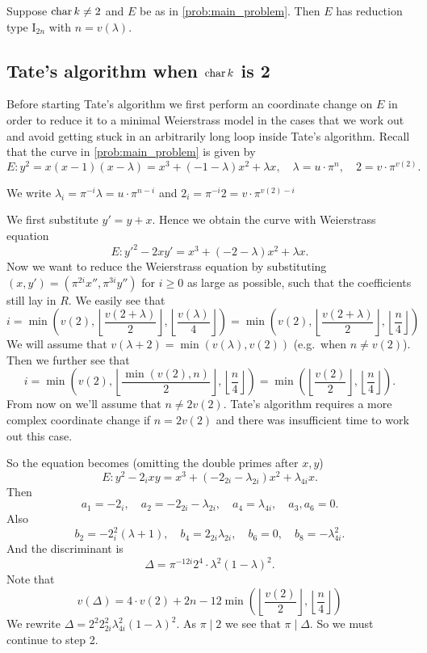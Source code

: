 \begin{proposition}\label{prop:conclusion_tate_tame}
	Suppose $\operatorname{char} k \ne 2$ and $E$ be as in \cref{prob:main_problem}. 
	Then $E$ has reduction type $\mathrm I_{2n}$ with $n = v(\lambda)$. 
\end{proposition}

\subsection{Tate's algorithm when $\operatorname{char} k$ is 2}  \label{sec:char_k_is_2}

Before starting Tate's algorithm we first perform an coordinate change on $E$ in order to reduce it to a minimal Weierstrass model in the cases that we work out and avoid getting stuck in an arbitrarily long loop inside Tate's algorithm. 
Recall that the curve in \cref{prob:main_problem} is given by \[
	E: y^2 = x(x-1)(x-\lambda) = x^3 + (-1 -\lambda) x^2 + \lambda x, \quad \lambda = u \cdot \pi^{n}, \quad 2 = v\cdot \pi^{v(2)}
.\] 
\begin{notation}
	We write $\lambda_i = \pi^{-i} \lambda = u\cdot \pi ^{n -i}$ and $2_i = \pi^{-i}2 = v \cdot \pi^{v(2) - i}$
\end{notation}
We first substitute $y' = y + x$. 
Hence we obtain the curve with Weierstrass equation \[
	E: y'^2 - 2xy' = x^3 + (-2-\lambda) x^2 + \lambda x
.\] 
Now we want to reduce the Weierstrass equation by substituting $(x, y') = (\pi^{2i} x'', \pi^{3i}y'')$ for $i \ge 0$ as large as possible, such that the coefficients still lay in $R$. 
We easily see that \[
	i =  \min\left(v(2), \left\lfloor \frac{v(2 + \lambda)}{2} \right\rfloor,  \left\lfloor \frac{v(\lambda)}{4} \right\rfloor\right) = \min\left(v(2), \left\lfloor \frac{v(2 + \lambda)}{2} \right\rfloor,  \left\lfloor \frac{n}{4} \right\rfloor\right) 
\]
We will assume that $v(\lambda + 2) = \min(v(\lambda), v(2))$ (e.g.\ when $n \ne v(2)$). 
Then we further see that \[
	i = \min\left(v(2), \left\lfloor \frac{\min (v(2), n)}{2} \right\rfloor,  \left\lfloor \frac{n}{4} \right\rfloor\right)  = \min\left(\left\lfloor \frac{v(2)}{2}\right\rfloor, \left\lfloor \frac{n}{4} \right\rfloor \right)
.\] 
From now on we'll assume that $n \ne 2v(2)$. 
Tate's algorithm requires a more complex coordinate change if $n = 2 v(2)$ and there was insufficient time to work out this case. 

So the equation becomes (omitting the double primes after $x, y$) \[
	E: y^2 - 2_i xy = x^3 + (-2_{2i} - \lambda_{2i})x^2 + \lambda_{4i}x
.\] 
Then \[
a_1 = -2_i, \quad a_2 = -2_{2i} - \lambda_{2i}, \quad a_4 =  \lambda_{4i}, \quad a_3, a_6 = 0 
.\] 
Also 
\[
	b_2 = -2_{i}^2 (\lambda + 1), \quad b_4 = 2_{2i}\lambda_{2i}, \quad b_6 = 0,\quad  b_8 = -\lambda_{4i}^2
.\] 
And the discriminant is \[
	\Delta = \pi^{-12i} 2^{4}\cdot \lambda^2(1 - \lambda)^2
.\] 
Note that \[
	v(\Delta) = 4\cdot v(2)+ 2n - 12 \min\left(\left\lfloor \frac{v(2)}{2}\right\rfloor, \left\lfloor \frac{n}{4} \right\rfloor \right)
\]
We rewrite $\Delta = 2^{2} 2_{2i}^2 \lambda_{4i}^2 (1- \lambda)^2$. 
As $\pi\mid 2$ we see that $\pi \mid \Delta$. 
So we must continue to step 2.


